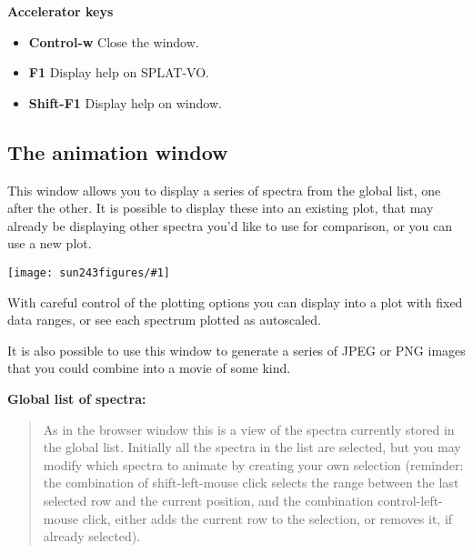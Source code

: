 \documentclass[twoside,11pt]{article}
\newcommand{\htmladdimg}[1]{}
\newcommand{\latexhtml}[2]{#1}
\newcommand{\xlabel}[1]{}
\renewcommand{\_}{\texttt{\symbol{95}}}
\newcommand{\SPLAT}{\textsf{SPLAT-VO}}
\newcommand{\mainfigure}[1]
{\begin{center}
 \latexhtml{\texttt{[image: sun243\_figures/\#1]}}{\htmladdimg{#1.gif}}
 \end{center}
}
\newcommand{\labelitem}[1]{\textbf{#1}}
\newcommand{\subheading}[1]{\textbf{\large{#1}}}
\begin{document}
\subheading{Accelerator keys}

\begin{itemize}
\item \labelitem{Control-w} Close the window.
\item \labelitem{F1} Display help on \SPLAT.
\item \labelitem{Shift-F1} Display help on window.
\end{itemize}

\newpage
\subsection{The animation window\xlabel{animation_window}}

This window allows you to display a series of spectra from the global list,
one after the other. It is possible to display these into an existing plot,
that may already be displaying other spectra you'd like to use for comparison,
or you can use a new plot.

\mainfigure{animationwindow}

With careful control of the plotting options you can display into a
plot with fixed data ranges, or see each spectrum plotted as
autoscaled.

It is also possible to use this window to generate a series of JPEG or PNG
images that you could combine into a movie of some kind.

\subheading{Global list of spectra:}
\begin{quote}
 As in the browser window this is a view of the spectra currently
 stored in the global list. Initially all the spectra in the list are
 selected, but you may modify which spectra to animate by creating your
 own selection (reminder: the combination of shift-left-mouse click
 selects the range between the last selected row and the current
 position, and the combination control-left-mouse click, either adds
 the current row to the selection, or removes it, if already selected).
\end{quote}
\end{document}
